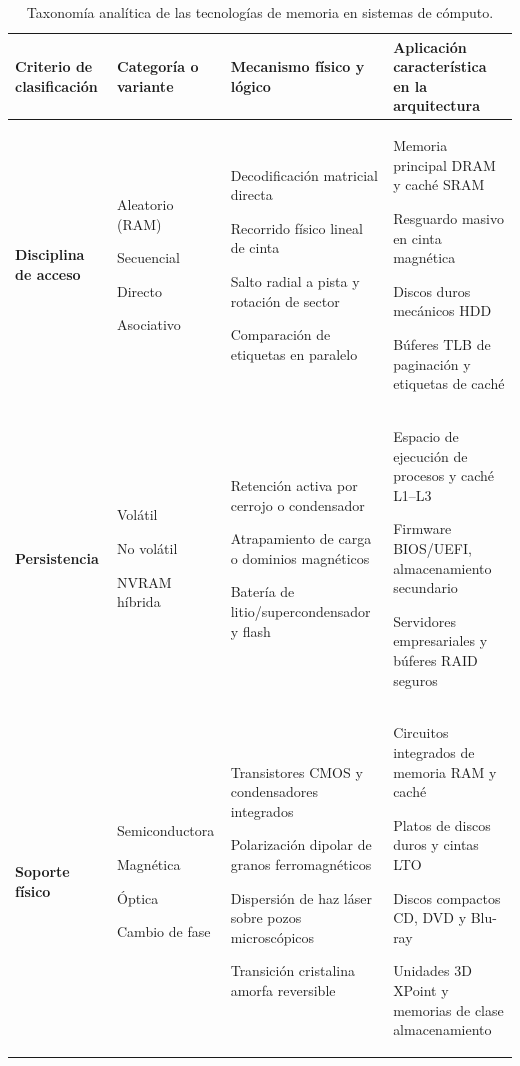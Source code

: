 \documentclass[12pt]{article}
\begin{document}
\begin{table}[htbp]
\centering
\small
\renewcommand{\arraystretch}{1.15}
\renewcommand{\tabularxcolumn}[1]{m{#1}}
\setlength{\emergencystretch}{1.5em}
\caption{Taxonomía analítica de las tecnologías de memoria en sistemas de cómputo.}
\label{tab:taxonomiaMemoria}
\begin{tabularx}{\textwidth}{>{\centering\arraybackslash}m{2.3cm} >{\centering\arraybackslash}m{2.9cm} X X}
\toprule
\textbf{Criterio de clasificación} & \textbf{Categoría o variante} & \textbf{Mecanismo físico y lógico} & \textbf{Aplicación característica en la arquitectura} \\
\midrule
\textbf{Disciplina de acceso} & Aleatorio (RAM) \par Secuencial \par Directo \par Asociativo & Decodificación matricial directa \par Recorrido físico lineal de cinta \par Salto radial a pista y rotación de sector \par Comparación de etiquetas en paralelo & Memoria principal DRAM y caché SRAM \par Resguardo masivo en cinta magnética \par Discos duros mecánicos HDD \par Búferes TLB de paginación y etiquetas de caché \\
\addlinespace
\textbf{Persistencia} & Volátil \par No volátil \par NVRAM híbrida & Retención activa por cerrojo o condensador \par Atrapamiento de carga o dominios magnéticos \par Batería de litio/supercondensador y flash & Espacio de ejecución de procesos y caché L1--L3 \par Firmware BIOS/UEFI, almacenamiento secundario \par Servidores empresariales y búferes RAID seguros \\
\addlinespace
\textbf{Soporte físico} & Semiconductora \par Magnética \par Óptica \par Cambio de fase & Transistores CMOS y condensadores integrados \par Polarización dipolar de granos ferromagnéticos \par Dispersión de haz láser sobre pozos microscópicos \par Transición cristalina amorfa reversible & Circuitos integrados de memoria RAM y caché \par Platos de discos duros y cintas LTO \par Discos compactos CD, DVD y Blu-ray \par Unidades 3D XPoint y memorias de clase almacenamiento \\

\end{tabularx}
\end{table}
\end{document}
